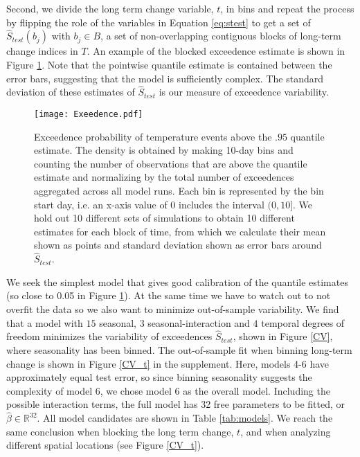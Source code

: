\documentclass{ametsoc}
\newcommand\smallfigwidth{\columnwidth}
\begin{document}
 Second, we divide the long term change variable, $t$, in bins and repeat the process by flipping the role of the variables in Equation \ref{eq:stest} to get a set of $\hat{S}_{test}(b_j)$ with $b_j \in B$, a set of non-overlapping contiguous blocks of long-term change indices in $T$. An example of the blocked exceedence estimate is shown in Figure \ref{Exeedence}. Note that the pointwise quantile estimate is contained between the error bars, suggesting that the model is sufficiently complex. The standard deviation of these estimates of $\hat{S}_{test}$ is our measure of exceedence variability. 


\begin{figure}[ht]
\centerline{\texttt{[image: Exeedence.pdf]}}
\caption{\small{Exceedence probability of temperature events above the $.95$ quantile estimate. The density is obtained by making 10-day bins and counting the number of observations that are above the quantile estimate and normalizing by the total number of exceedences aggregated across all model runs. Each bin is represented by the bin start day, i.e. an x-axis value of 0 includes the interval $(0,10]$. We hold out 10 different sets of simulations to obtain 10 different estimates for each block of time, from which we calculate their mean shown as points and standard deviation shown as error bars around $\hat{S}_{test}$.}}
\label{Exeedence}
\end{figure}

We seek the simplest model that gives good calibration of the quantile estimates (so close to 0.05 in Figure \ref{Exeedence}). At the same time we have to watch out to not overfit the data so we also want to minimize out-of-sample variability. We find that a model with $15$ seasonal, $3$ seasonal-interaction and $4$ temporal degrees of freedom minimizes the variability of exceedences $\hat{S}_{test}$, shown in Figure \ref{CV}, where seasonality has been binned. The out-of-sample fit when binning long-term change is shown in Figure \ref{CV_t} in the supplement. Here, models 4-6 have approximately equal test error, so since binning seasonality suggests the complexity of model 6, we chose model 6 as the overall model. Including the possible interaction terms, the full model has 32 free parameters to be fitted, or $\hat{\beta} \in \mathbb{R}^{32}$. All model candidates are shown in Table \ref{tab:models}. We reach the same conclusion when blocking the long term change, $t$, and when analyzing different spatial locations (see Figure \ref{CV_t}).
\end{document}
